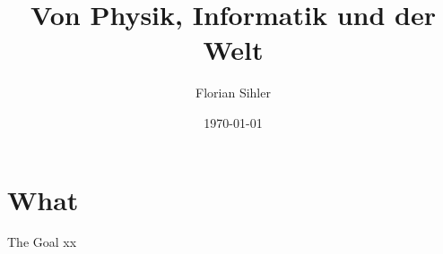 \documentclass[aspectratio=169,usepdftitle=true,handout]{beamer}
\title{Von Physik, Informatik und der Welt}
\date{\today}
\author[F.~Sihler]{Florian Sihler}
\begin{document}
\section{What}
\begin{frame}[fragile]{The Goal}
xx
\end{frame}
\end{document}
